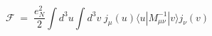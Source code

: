 \begin{equation}\label{eq:eff1}
{\mathcal F} \;=\; \frac{e_N^2}{2} \int d^3u \int d^3v \;
j_\mu(u) \langle u |M^{-1}_{\mu\nu}|v\rangle j_\nu(v) 
\end{equation}

